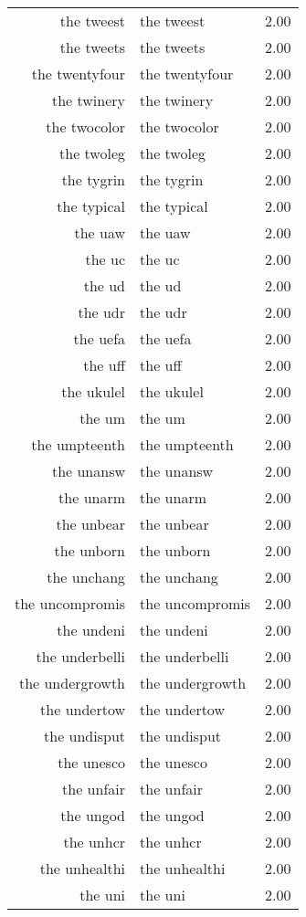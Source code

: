 \begin{table}[ht]
\begin{tabular}{rlr}
  the tweest & the tweest & 2.00 \\ 
  the tweets & the tweets & 2.00 \\ 
  the twentyfour & the twentyfour & 2.00 \\ 
  the twinery & the twinery & 2.00 \\ 
  the twocolor & the twocolor & 2.00 \\ 
  the twoleg & the twoleg & 2.00 \\ 
  the tygrin & the tygrin & 2.00 \\ 
  the typical & the typical & 2.00 \\ 
  the uaw & the uaw & 2.00 \\ 
  the uc & the uc & 2.00 \\ 
  the ud & the ud & 2.00 \\ 
  the udr & the udr & 2.00 \\ 
  the uefa & the uefa & 2.00 \\ 
  the uff & the uff & 2.00 \\ 
  the ukulel & the ukulel & 2.00 \\ 
  the um & the um & 2.00 \\ 
  the umpteenth & the umpteenth & 2.00 \\ 
  the unansw & the unansw & 2.00 \\ 
  the unarm & the unarm & 2.00 \\ 
  the unbear & the unbear & 2.00 \\ 
  the unborn & the unborn & 2.00 \\ 
  the unchang & the unchang & 2.00 \\ 
  the uncompromis & the uncompromis & 2.00 \\ 
  the undeni & the undeni & 2.00 \\ 
  the underbelli & the underbelli & 2.00 \\ 
  the undergrowth & the undergrowth & 2.00 \\ 
  the undertow & the undertow & 2.00 \\ 
  the undisput & the undisput & 2.00 \\ 
  the unesco & the unesco & 2.00 \\ 
  the unfair & the unfair & 2.00 \\ 
  the ungod & the ungod & 2.00 \\ 
  the unhcr & the unhcr & 2.00 \\ 
  the unhealthi & the unhealthi & 2.00 \\ 
  the uni & the uni & 2.00 \\ 

\end{tabular}
\end{table}
